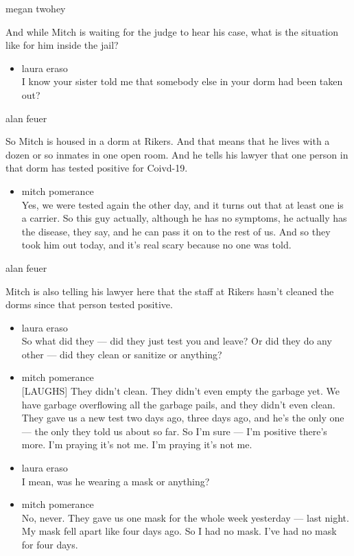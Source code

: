 megan twohey

And while Mitch is waiting for the judge to hear his case, what is the
situation like for him inside the jail?

\begin{itemize}
\tightlist
\item
  laura eraso\\
  I know your sister told me that somebody else in your dorm had been
  taken out?
\end{itemize}

alan feuer

So Mitch is housed in a dorm at Rikers. And that means that he lives
with a dozen or so inmates in one open room. And he tells his lawyer
that one person in that dorm has tested positive for Coivd-19.

\begin{itemize}
\tightlist
\item
  mitch pomerance\\
  Yes, we were tested again the other day, and it turns out that at
  least one is a carrier. So this guy actually, although he has no
  symptoms, he actually has the disease, they say, and he can pass it on
  to the rest of us. And so they took him out today, and it's real scary
  because no one was told.
\end{itemize}

alan feuer

Mitch is also telling his lawyer here that the staff at Rikers hasn't
cleaned the dorms since that person tested positive.

\begin{itemize}
\item
  laura eraso\\
  So what did they --- did they just test you and leave? Or did they do
  any other --- did they clean or sanitize or anything?
\item
  mitch pomerance\\
  {[}LAUGHS{]} They didn't clean. They didn't even empty the garbage
  yet. We have garbage overflowing all the garbage pails, and they
  didn't even clean. They gave us a new test two days ago, three days
  ago, and he's the only one --- the only they told us about so far. So
  I'm sure --- I'm positive there's more. I'm praying it's not me. I'm
  praying it's not me.
\item
  laura eraso\\
  I mean, was he wearing a mask or anything?
\item
  mitch pomerance\\
  No, never. They gave us one mask for the whole week yesterday --- last
  night. My mask fell apart like four days ago. So I had no mask. I've
  had no mask for four days.
\end{itemize}

